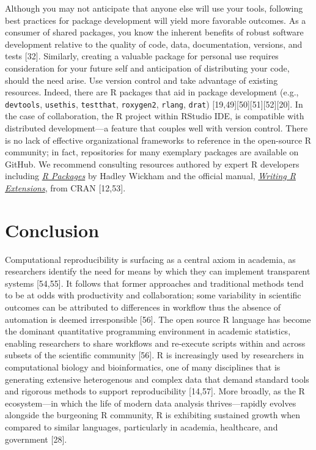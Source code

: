 \documentclass[10pt,letterpaper]{article}
\begin{document}
Although you may not anticipate that anyone else will use your tools,
following best practices for package development will yield more
favorable outcomes. As a consumer of shared packages, you know the
inherent benefits of robust software development relative to the quality
of code, data, documentation, versions, and tests {[}32{]}. Similarly,
creating a valuable package for personal use requires consideration for
your future self and anticipation of distributing your code, should the
need arise. Use version control and take advantage of existing
resources. Indeed, there are R packages that aid in package development
(e.g., \texttt{devtools}, \texttt{usethis}, \texttt{testthat},
\texttt{roxygen2}, \texttt{rlang}, \texttt{drat})
{[}19,49{]}{[}50{]}{[}51{]}{[}52{]}{[}20{]}. In the case of
collaboration, the R project within RStudio IDE, is compatible with
distributed development---a feature that couples well with version
control. There is no lack of effective organizational frameworks to
reference in the open-source R community; in fact, repositories for many
exemplary packages are available on GitHub. We recommend consulting
resources authored by expert R developers including
\href{https://r-pkgs.org/}{\emph{R Packages}} by Hadley Wickham and the
official manual,
\href{https://cran.r-project.org/doc/manuals/r-release/R-exts.html}{\emph{Writing
R Extensions}}, from CRAN {[}12,53{]}.

\hypertarget{conclusion}{%
\section{Conclusion}\label{conclusion}}

Computational reproducibility is surfacing as a central axiom in
academia, as researchers identify the need for means by which they can
implement transparent systems {[}54,55{]}. It follows that former
approaches and traditional methods tend to be at odds with productivity
and collaboration; some variability in scientific outcomes can be
attributed to differences in workflow thus the absence of automation is
deemed irresponsible {[}56{]}. The open source R language has become the
dominant quantitative programming environment in academic statistics,
enabling researchers to share workflows and re-execute scripts within
and across subsets of the scientific community {[}56{]}. R is
increasingly used by researchers in computational biology and
bioinformatics, one of many disciplines that is generating extensive
heterogenous and complex data that demand standard tools and rigorous
methods to support reproducibility {[}14,57{]}. More broadly, as the R
ecosystem---in which the life of modern data analysis thrives---rapidly
evolves alongside the burgeoning R community, R is exhibiting sustained
growth when compared to similar languages, particularly in academia,
healthcare, and government {[}28{]}.
\end{document}
